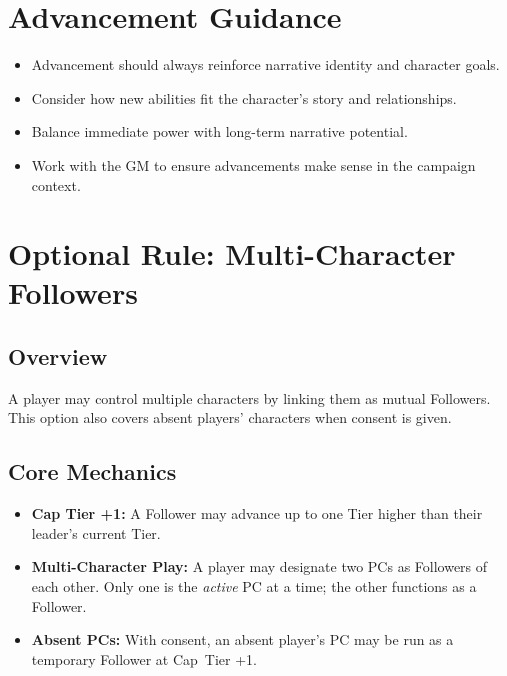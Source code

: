 \section{Advancement Guidance}
\label{sec:advancement-guidance}

\begin{itemize}
\item Advancement should always reinforce narrative identity and character goals.
\item Consider how new abilities fit the character's story and relationships.
\item Balance immediate power with long-term narrative potential.
\item Work with the GM to ensure advancements make sense in the campaign context.
\end{itemize}

\section{Optional Rule: Multi-Character Followers}
\label{sec:multi-character-followers}

\subsection*{Overview}
A player may control multiple characters by linking them as mutual Followers. This option also covers absent players' characters when consent is given.

\subsection*{Core Mechanics}
\begin{itemize}
  \item \textbf{Cap Tier +1:} A Follower may advance up to one Tier higher than their leader’s current Tier.
  \item \textbf{Multi-Character Play:} A player may designate two PCs as Followers of each other. Only one is the \emph{active} PC at a time; the other functions as a Follower.
  \item \textbf{Absent PCs:} With consent, an absent player’s PC may be run as a temporary Follower at Cap~Tier +1.
\end{itemize}

